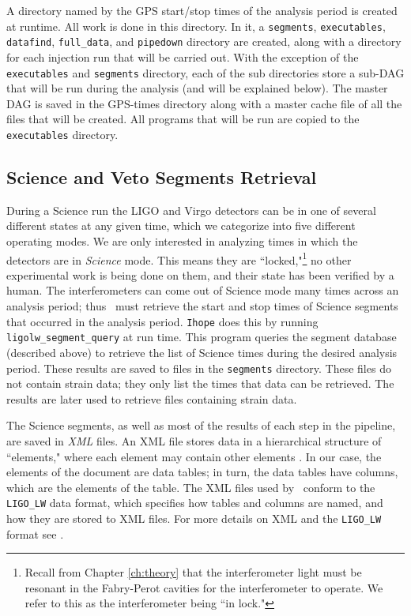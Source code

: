 A directory named by the GPS start/stop times of the analysis period is created
at runtime. All work is done in this directory. In it, a \texttt{segments},
\texttt{executables}, \texttt{datafind}, \texttt{full\_data}, and
\texttt{pipedown} directory are created, along with a directory for each
injection run that will be carried out. With the exception of the
\texttt{executables} and \texttt{segments} directory, each of the sub
directories store a sub-\ac{DAG} that will be run during the analysis (and will
be explained below). The master \ac{DAG} is saved in the GPS-times directory
along with a master cache file of all the files that will be created. All
programs that will be run are copied to the \texttt{executables} directory.

\subsection{Science and Veto Segments Retrieval}
\label{sec:science_segs_and_vetoes}

During a Science run the \ac{LIGO} and Virgo detectors can be in one of several
different states at any given time, which we categorize into five different
operating modes. We are only interested in analyzing times in which the
detectors are in {\it Science} mode. This means they are
``locked,"\footnote{Recall from Chapter \ref{ch:theory} that the interferometer
light must be resonant in the Fabry-Perot cavities for the interferometer to
operate. We refer to this as the interferometer being ``in lock."} no other
experimental work is being done on them, and their state has been verified by a
human. The interferometers can come out of Science mode many times across an
analysis period; thus \ihope~must retrieve the start and stop times of Science
segments that occurred in the analysis period. \verb|Ihope| does this by
running \texttt{ligolw\_segment\_query} \cite{BPP:segdb} at run time. This program queries the
segment database (described above) to retrieve the list of Science times during
the desired analysis period.  These results are saved to files in the
\texttt{segments} directory. These files do not contain strain data; they only
list the times that data can be retrieved. The results are later used to
retrieve files containing strain data.

The Science segments, as well as most of the results of each step in the
pipeline, are saved in \emph{XML} files. An XML file stores data in a
hierarchical structure of ``elements," where each element may contain other
elements \cite{tech:Williams:2005}. In our case, the elements of the document
are data tables; in turn, the data tables have columns, which are the elements
of the table. The XML files used by \ihope~conform to the \verb|LIGO_LW| data
format, which specifies how tables and columns are named, and how they are
stored to XML files. For more details on XML and the \verb|LIGO_LW| format see
\cite{tech:Williams:2005}.

